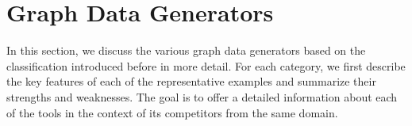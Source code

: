 \section{Graph Data Generators}
\label{sec:generators}

In this section, we discuss the various graph data generators based on the classification introduced before in more detail. For each category, we first describe the key features of each of the representative examples and summarize their strengths and weaknesses. The goal is to offer a detailed information about each of the tools in the context of its competitors from the same domain.










%






